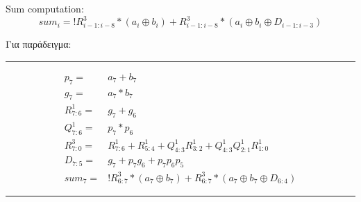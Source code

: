 Sum computation:\\
\begin{equation}
sum_i = !R^3_{i-1:i-8} * (a_i \oplus b_i) + R^3_{i-1:i-8} * (a_i \oplus b_i \oplus D_{i-1:i-3})
\end{equation}

Για παράδειγμα:\\
\rule{\linewidth}{0.5mm}
\begin{equation*}
\begin{split}
p_7 =& a_7 + b_7\\
g_7 =& a_7 * b_7\\
R^1_{7:6} =& g_7 + g_{6}\\
Q^1_{7:6} =& p_7 * p_{6}\\
R^3_{7:0} =& R^1_{7:6} + R^1_{5:4} + Q^1_{4:3} R^1_{3:2} + Q^1_{4:3} Q^1_{2:1} R^1_{1:0}\\
D_{7:5} =& g_7 + p_7g_{6} + p_7p_{6}p_{5}\\
sum_7 =& !R^3_{6:7} * (a_7 \oplus b_7) + R^3_{6:7} * (a_7 \oplus b_7 \oplus D_{6:4})
\end{split}
\end{equation*}
\rule{\linewidth}{0.5mm}











